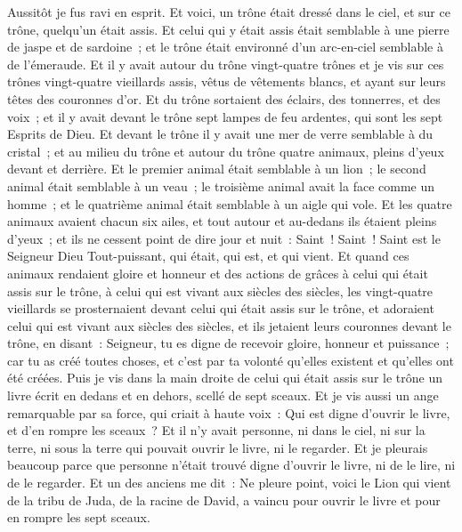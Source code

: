 \begin{multicols}{2}
Aussitôt je fus ravi en esprit. Et voici, un trône était dressé dans le ciel, et sur ce trône, quelqu'un était assis.
Et celui qui y était assis était semblable à une pierre de jaspe et de sardoine~; et le trône était environné d'un arc-en-ciel semblable à de l'émeraude.
Et il y avait autour du trône vingt-quatre trônes et je vis sur ces trônes vingt-quatre vieillards assis, vêtus de vêtements blancs, et ayant sur leurs têtes des couronnes d'or.
Et du trône sortaient des éclairs, des tonnerres, et des voix~; et il y avait devant le trône sept lampes de feu ardentes, qui sont les sept Esprits de Dieu.
Et devant le trône il y avait une mer de verre semblable à du cristal~; et au milieu du trône et autour du trône quatre animaux, pleins d'yeux devant et derrière.
Et le premier animal était semblable à un lion~; le second animal était semblable à un veau~; le troisième animal avait la face comme un homme~; et le quatrième animal était semblable à un aigle qui vole.
Et les quatre animaux avaient chacun six ailes, et tout autour et au-dedans ils étaient pleins d'yeux~; et ils ne cessent point de dire jour et nuit~: Saint~! Saint~! Saint est le Seigneur Dieu Tout-puissant, qui était, qui est, et qui vient.
Et quand ces animaux rendaient gloire et honneur et des actions de grâces à celui qui était assis sur le trône, à celui qui est vivant aux siècles des siècles,
les vingt-quatre vieillards se prosternaient devant celui qui était assis sur le trône, et adoraient celui qui est vivant aux siècles des siècles, et ils jetaient leurs couronnes devant le trône, en disant~:
Seigneur, tu es digne de recevoir gloire, honneur et puissance~; car tu as créé toutes choses, et c'est par ta volonté qu'elles existent et qu'elles ont été créées.
\VerseOne{}Puis je vis dans la main droite de celui qui était assis sur le trône un livre écrit en dedans et en dehors, scellé de sept sceaux.
Et je vis aussi un ange remarquable par sa force, qui criait à haute voix~: Qui est digne d'ouvrir le livre, et d'en rompre les sceaux~?
Et il n'y avait personne, ni dans le ciel, ni sur la terre, ni sous la terre qui pouvait ouvrir le livre, ni le regarder.
Et je pleurais beaucoup parce que personne n'était trouvé digne d'ouvrir le livre, ni de le lire, ni de le regarder.
Et un des anciens me dit~: Ne pleure point, voici le Lion qui vient de la tribu de Juda, de la racine de David, a vaincu pour ouvrir le livre et pour en rompre les sept sceaux.

\end{multicols}
